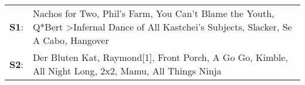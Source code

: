 \begin{supertabular}{p{0.03\textwidth}p{0.92\textwidth}}
 \textbf{S1}:  &  Nachos for Two\textsuperscript{}, \enspace Phil's Farm\textsuperscript{}, \enspace You Can't Blame the Youth\textsuperscript{}, \enspace Q*Bert\textsuperscript{} \textgreater \enspace Infernal Dance of All Kastchei's Subjects\textsuperscript{}, \enspace Slacker\textsuperscript{}, \enspace Se A Cabo\textsuperscript{}, \enspace Hangover\textsuperscript{}  \enspace  \\
 \textbf{S2}:  &                     Der Bluten Kat\textsuperscript{}, \enspace Raymond[1]\textsuperscript{}, \enspace Front Porch\textsuperscript{}, \enspace A Go Go\textsuperscript{}, \enspace Kimble\textsuperscript{}, \enspace All Night Long\textsuperscript{}, \enspace 2x2\textsuperscript{}, \enspace Mamu\textsuperscript{}, \enspace All Things Ninja\textsuperscript{}  \enspace  \\
\end{supertabular}

